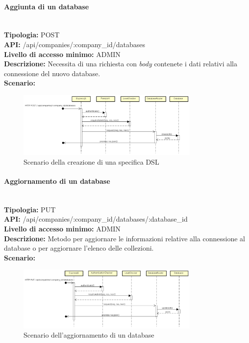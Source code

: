 \newpage
\paragraph{Aggiunta di un database}\mbox{}\\
\textbf{Tipologia:} POST \\
\textbf{API:} /api/companies/:company\_id/databases \\
\textbf{Livello di accesso minimo:} ADMIN \\
\textbf{Descrizione:} Necessita di una richiesta con \textit{body} contenete i dati relativi alla connessione del nuovo database. \\
\textbf{Scenario:}
\begin{figure}[H]
\centering
\includegraphics[width=0.8\textwidth]{res/sections/backend/sequence/(POST)database.png}
\caption{Scenario della creazione di una specifica DSL}
\end{figure}

\newpage
\paragraph{Aggiornamento di un database}\mbox{}\\
\textbf{Tipologia:} PUT \\
\textbf{API:} /api/companies/:company\_id/databases/:database\_id \\
\textbf{Livello di accesso minimo:} ADMIN \\
\textbf{Descrizione:} Metodo per aggiornare le informazioni relative alla connessione al database o per aggiornare l'elenco delle collezioni. \\
\textbf{Scenario:}
\begin{figure}[H]
\centering
\includegraphics[width=0.8\textwidth]{res/sections/backend/sequence/(PUT)database.png}
\caption{Scenario dell'aggiornamento di un database}
\end{figure}

